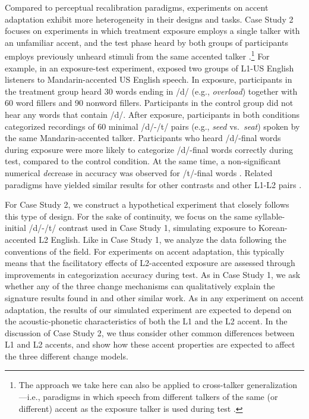 \documentclass[
  11pt,
  man,floatsintext]{apa6}
\begin{document}
Compared to perceptual recalibration paradigms, experiments on accent adaptation exhibit more heterogeneity in their designs and tasks. Case Study 2 focuses on experiments in which treatment exposure employs a single talker with an unfamiliar accent, and the test phase heard by both groups of participants employs previously unheard stimuli from the same accented talker \autocites[e.g.,][]{eisner2013,schertz2015,xie2017}.\footnote{The approach we take here can also be applied to cross-talker generalization---i.e., paradigms in which speech from different talkers of the same (or different) accent as the exposure talker is used during test \autocite{baeseberk2013,bradlow-bent2008,sidaras2009}.} For example, in an exposure-test experiment, \textcite{xie2016jep} exposed two groups of L1-US English listeners to Mandarin-accented US English speech. In exposure, participants in the treatment group heard 30 words ending in /d/ (e.g., \emph{overload}) together with 60 word fillers and 90 nonword fillers. Participants in the control group did not hear any words that contain /d/. After exposure, participants in both conditions categorized recordings of 60 minimal /d/-/t/ pairs (e.g., \emph{seed} vs.~\emph{seat}) spoken by the same Mandarin-accented talker. Participants who heard /d/-final words during exposure were more likely to categorize /d/-final words correctly during test, compared to the control condition. At the same time, a non-significant numerical \emph{de}crease in accuracy was observed for /t/-final words \autocite[see also][]{xie2018lcn}. Related paradigms have yielded similar results for other contrasts and other L1-L2 pairs \autocites[e.g.,][]{zheng-samuel2020,eisner2013}.

For Case Study 2, we construct a hypothetical experiment that closely follows this type of design. For the sake of continuity, we focus on the same syllable-initial /d/-/t/ contrast used in Case Study 1, simulating exposure to Korean-accented L2 English. Like in Case Study 1, we analyze the data following the conventions of the field. For experiments on accent adaptation, this typically means that the facilitatory effects of L2-accented exposure are assessed through improvements in categorization accuracy during test. As in Case Study 1, we ask whether any of the three change mechanisms can qualitatively explain the signature results found in \textcite{xie2016jep} and other similar work. As in any experiment on accent adaptation, the results of our simulated experiment are expected to depend on the acoustic-phonetic characteristics of both the L1 and the L2 accent. In the discussion of Case Study 2, we thus consider other common differences between L1 and L2 accents, and show how these accent properties are expected to affect the three different change models.
\end{document}
